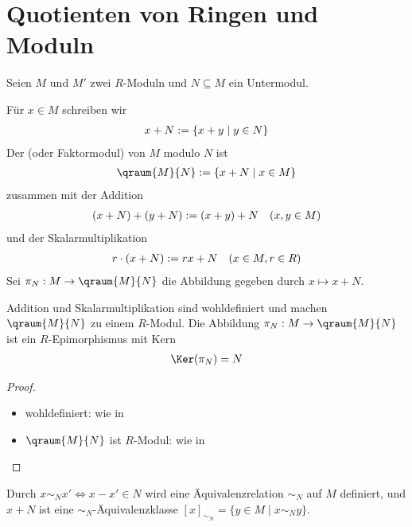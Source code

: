 \section{Quotienten von Ringen und Moduln}

Seien $M$ und $M'$ zwei $R$-Moduln und $N\subseteq M$ ein Untermodul.

\begin{definition}[Quotientenmodul]
	Für $x\in M$ schreiben wir
	\begin{align}
		x+N:=\{x+y\mid y\in N\}\notag
	\end{align}
	Der  (oder Faktormodul) von $M$ modulo $N$ ist
	\begin{align}
		\qraum{M}{N}:=\{x+N\mid x\in M\}\notag
	\end{align}
	zusammen mit der Addition
	\begin{align}
		(x+N)+(y+N):=(x+y)+N\quad (x,y\in M)\notag
	\end{align}
	und der Skalarmultiplikation
	\begin{align}
		r\cdot (x+N) := rx+N\quad (x\in M,r\in R)\notag
	\end{align}
	Sei $\pi_N:M\to \qraum{M}{N}$ die Abbildung gegeben durch $x\mapsto x+N$.
\end{definition}

\begin{lemma}
	Addition und Skalarmultiplikation sind wohldefiniert und machen $\qraum{M}{N}$ zu einem $R$-Modul. Die Abbildung $\pi_N:M\to \qraum{M}{N}$ ist ein $R$-Epimorphismus mit Kern
	\begin{align}
		\Ker(\pi_N)=N\notag
	\end{align}
\end{lemma}
\begin{proof}
	\begin{itemize}
		\item wohldefiniert: wie in 
		\item $\qraum{M}{N}$ ist $R$-Modul: wie in 
	\end{itemize}
\end{proof}

\begin{remark}
	Durch $x\sim_N x' \iff x-x'\in N$ wird eine Äquivalenzrelation $\sim_N$ auf $M$ definiert, und $x+N$ ist eine $\sim_N$-Äquivalenzklasse $[x]_{\sim_N}=\{y\in M\mid x\sim_N y\}$.
\end{remark}

